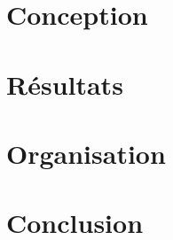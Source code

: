 \documentclass[11pt]{article}
\begin{document}
\newpage



\section{Conception}
\newpage 

\section{Résultats}
\newpage 
\section{Organisation}
\newpage 
\section{Conclusion}

\newpage
%
%
\end{document}
